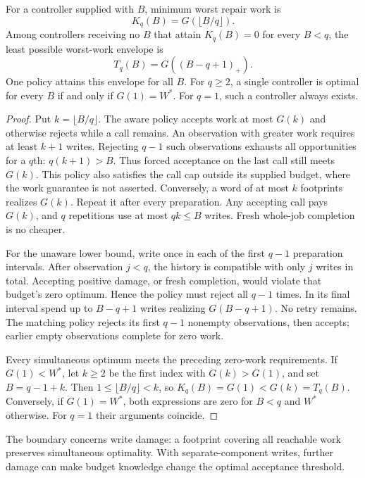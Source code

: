 \begin{theorem}
\label{thm:repair}
For a controller supplied with $B$, minimum worst repair work is
\[
K_q(B)=G(\lfloor B/q\rfloor).
\]
Among controllers receiving no $B$ that attain $K_q(B)=0$ for every $B<q$, the least possible worst-work envelope is
\[
T_q(B)=G((B-q+1)_+).
\]
One policy attains this envelope for all $B$. For $q\ge2$, a single controller is optimal for every $B$ if and only if $G(1)=W^*$. For $q=1$, such a controller always exists.
\end{theorem}
\begin{proof}
Put $k=\lfloor B/q\rfloor$. The aware policy accepts work at most $G(k)$ and otherwise rejects while a call remains. An observation with greater work requires at least $k+1$ writes. Rejecting $q-1$ such observations exhausts all opportunities for a $q$th: $q(k+1)>B$. Thus forced acceptance on the last call still meets $G(k)$. This policy also satisfies the call cap outside its supplied budget, where the work guarantee is not asserted. Conversely, a word of at most $k$ footprints realizes $G(k)$. Repeat it after every preparation. Any accepting call pays $G(k)$, and $q$ repetitions use at most $qk\le B$ writes. Fresh whole-job completion is no cheaper.

For the unaware lower bound, write once in each of the first $q-1$ preparation intervals. After observation $j<q$, the history is compatible with only $j$ writes in total. Accepting positive damage, or fresh completion, would violate that budget's zero optimum. Hence the policy must reject all $q-1$ times. In its final interval spend up to $B-q+1$ writes realizing $G(B-q+1)$. No retry remains. The matching policy rejects its first $q-1$ nonempty observations, then accepts; earlier empty observations complete for zero work.

Every simultaneous optimum meets the preceding zero-work requirements. If $G(1)<W^*$, let $k\ge2$ be the first index with $G(k)>G(1)$, and set $B=q-1+k$. Then $1\le\lfloor B/q\rfloor<k$, so $K_q(B)=G(1)<G(k)=T_q(B)$. Conversely, if $G(1)=W^*$, both expressions are zero for $B<q$ and $W^*$ otherwise. For $q=1$ their arguments coincide.
\end{proof}

The boundary concerns write damage: a footprint covering all reachable work preserves simultaneous optimality. With separate-component writes, further damage can make budget knowledge change the optimal acceptance threshold.

